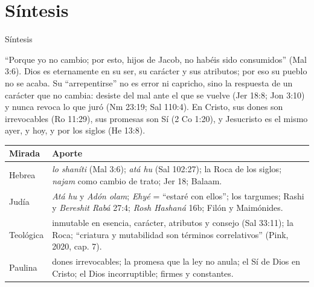 \section{Síntesis}

\begin{frame}{Síntesis}
\begin{tcolorbox}[colback=papiro,colframe=azul,boxrule=1pt,arc=3pt]
\small ``Porque yo \SENOR{} no cambio; por esto, hijos de Jacob, no habéis sido consumidos'' (Mal 3:6). Dios es eternamente  en su ser, su carácter y sus atributos; por eso su pueblo no se acaba. Su ``arrepentirse'' no es error ni capricho, sino la respuesta  de un carácter que no cambia: desiste del mal ante el que se vuelve (Jer 18:8; Jon 3:10) y nunca revoca lo que juró (Nm 23:19; Sal 110:4). En Cristo, sus dones son irrevocables (Ro 11:29), sus promesas son Sí (2 Co 1:20), y Jesucristo es el mismo ayer, y hoy, y por los siglos (He 13:8).
\end{tcolorbox}
\scriptsize\renewcommand{\arraystretch}{1.13}
\begin{tabular}{@{}>{\RaggedRight\arraybackslash}p{2.0cm}>{\RaggedRight\arraybackslash}p{9.8cm}@{}}
\toprule
\textbf{Mirada} & \textbf{Aporte} \\ \midrule
Hebrea & \emph{lo shaníti} (Mal 3:6); \emph{atá hu} (Sal 102:27); la Roca de los siglos; \emph{najam} como cambio de trato; Jer 18; Balaam. \\
Judía & \emph{Atá hu} y \emph{Adón olam}; \emph{Ehyé} = ``estaré con ellos''; los targumes; Rashi y \emph{Bereshit Rabá} 27:4; \emph{Rosh Hashaná} 16b; Filón y Maimónides. \\
Teológica & inmutable en esencia, carácter, atributos y consejo (Sal 33:11); la Roca; ``criatura y mutabilidad son términos correlativos'' (Pink, 2020, cap. 7). \\
Paulina & dones irrevocables; la promesa que la ley no anula; el Sí de Dios en Cristo; el Dios incorruptible; firmes y constantes. \\
\bottomrule
\end{tabular}
\end{frame}

